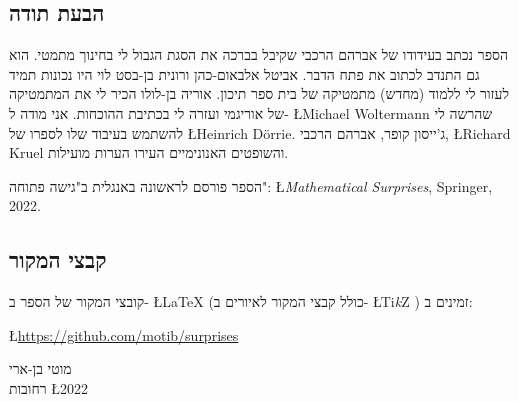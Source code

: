 
\subsection*{הבעת תודה}

הספר נכתב בעידודו של אברהם הרכבי שקיבל בברכה את הסגת הגבול לי בחינוך מתמטי. הוא גם התנדב לכתוב את פתח הדבר. אביטל אלבאום-כהן ורונית בן-בסט לוי היו נכונות תמיד לעזור לי ללמוד (מחדש) מתמטיקה של בית ספר תיכון. אוריה בן-לולו הכיר לי את המתמטיקה של אוריגמי ועזרה לי בכתיבת ההוכחות. אני מודה ל-%
\L{Michael Woltermann}
שהרשה לי להשתמש בעיבוד שלו לספרו של
\L{Heinrich D\"{o}rrie}.
ג'ייסון קופר, אברהם הרכבי,
\L{Richard Kruel}
והשופטים האנונימיים העירו הערות מועילות.

הספר פורסם לראשונה באנגלית ב"גישה פתוחה":
\L{\textit{Mathematical Surprises}, Springer, 2022}.

\subsection*{קבצי המקור}
קובצי המקור של הספר ב-%
\L{\LaTeX{}}
(כולל קבצי המקור לאיורים ב-%
\L{Ti\textit{k}Z}%
)
זמינים ב:
\begin{center}
\L{\url{https://github.com/motib/surprises}}
\end{center}

\medskip

\begin{flushleft}
מוטי בן-ארי
\\
רחובות
\L{2022}
\end{flushleft}

\tableofcontents
